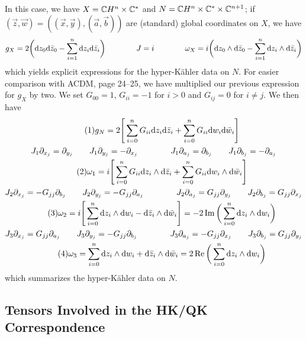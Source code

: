 In this case, we have $X=\mathbb{C} H^n\times \mathbb{C}^*$ and $N=\mathbb{C} H^n\times \mathbb{C}^*\times \mathbb{C}^{n+1}$; if $(\vec z,\vec w)=((\vec x,\vec y), (\vec a,\vec b))$ are (standard) global coordinates on $X$, we have
\begin{equation*}
	g_X =2\bigg( \mathrm{d} z_0 \mathrm{d} \bar z_0 - \sum_{i=1}^n \mathrm{d} z_i \mathrm{d} \bar z_i \bigg) \qquad \qquad 
	J=i \qquad \qquad 
	\omega_X=i\bigg(\mathrm{d} z_0 \wedge \mathrm{d} \bar z_0 - \sum_{i=1}^n \mathrm{d} z_i \wedge \mathrm{d} \bar z_i\bigg)
\end{equation*}
which yields explicit expressions for the hyper-K\"ahler data on $N$. For easier comparison with ACDM, page 24--25, we have multiplied our previous expression for $g_X$ by two. We set $G_{00}=1$, $G_{ii}=-1$ for $i>0$ and $G_{ij}=0$ for $i\neq j$. We then have
\begin{gather*}\numberthis
	g_N=2\Bigg[\sum_{i=0}^n G_{ii} \d z_i \d \bar z_i+\sum_{i=0}^n G_{ii} \d w_i \d \bar w_i\Bigg]\\
	J_1\p_{x_j}=\p_{y_j} \qquad J_1\p_{y_j}=-\p_{x_j} \qquad \qquad J_1 \p_{a_j}=\p_{b_j} \qquad J_1 \p_{b_j}=-\p_{a_j}\\
	\numberthis
	\omega_1=i\Bigg[\sum_{i=0}^n G_{ii}\d z_i \wedge \d \bar z_i+\sum_{i=0}^n G_{ii}\d w_i \wedge \d \bar w_i\Bigg]\\
	J_2\p_{x_j}=-G_{jj}\p_{b_j}\qquad J_2\p_{y_j}=-G_{jj}\p_{a_j} \qquad \qquad J_2 \p_{a_j}=G_{jj}\p_{y_j}\qquad J_2\p_{b_j}=G_{jj}\p_{x_j}\\
	\numberthis
	\omega_2=i\Bigg[\sum_{i=0}^n \d z_i \wedge \d w_i - \d \bar z_i \wedge \d \bar w_i\Bigg]
	=-2\Im\bigg(\sum_{i=0}^n \d z_i \wedge \d w_i\bigg)\\
	J_3\p_{x_j}=G_{jj}\p_{a_j} \qquad J_3\p_{y_j}=-G_{jj}\p_{b_j}\qquad \qquad J_3\p_{a_j}=-G_{jj}\p_{x_j}
	\qquad J_3\p_{b_j}=G_{jj}\p_{y_j}\\
	\numberthis
	\omega_3=\sum_{i=0}^n \d z_i\wedge \d w_i+\d \bar z_i \wedge \d \bar w_i
	=2\Re\bigg(\sum_{i=0}^n \d z_i \wedge \d w_i\bigg)
\end{gather*}
which summarizes the hyper-K\"ahler data on $N$. 

\subsection{Tensors Involved in the HK/QK Correspondence}

